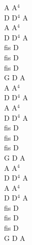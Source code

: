 \documentclass[a5paper, 10pt]{book}
\begin{document}
\begin{minipage}[t]{0.3\textwidth}
  A A$^4$\\
  D D$^4$ A\\
  A A$^4$\\
  D D$^4$ A\\
  fis D\\
  fis D\\
  fis D\\
  G D A\\

  A A$^4$\\
  D D$^4$ A\\
  A A$^4$\\
  D D$^4$ A\\
  fis D\\
  fis D\\
  fis D\\
  G D A\\

  A A$^4$\\
  D D$^4$ A\\
  A A$^4$\\
  D D$^4$ A\\
  fis D\\
  fis D\\
  fis D\\
  G D A\\
\end{minipage}

\newpage
\end{document}
